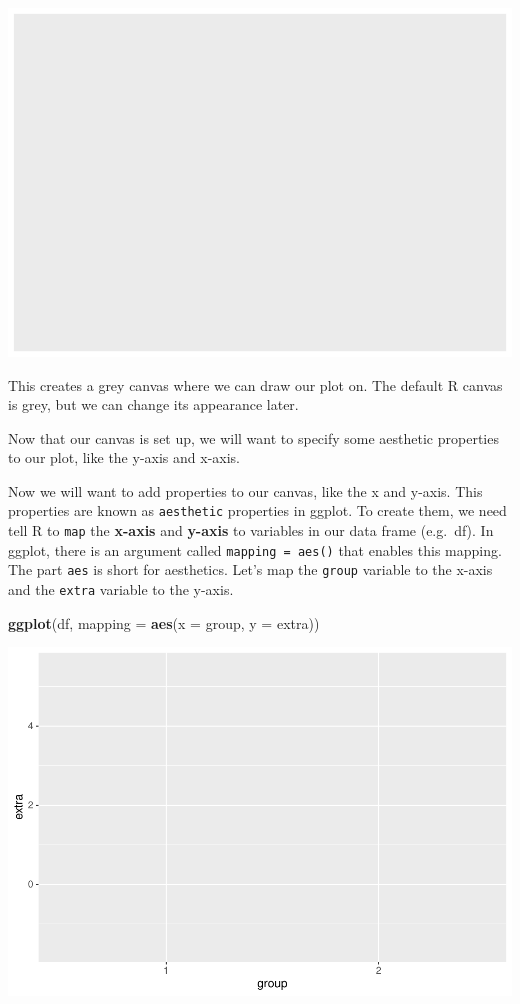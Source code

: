 \documentclass[
]{book}
\newenvironment{Shaded}{\begin{snugshade}}{\end{snugshade}}
\newcommand{\AttributeTok}[1]{\textcolor[rgb]{0.13,0.29,0.53}{#1}}
\newcommand{\FunctionTok}[1]{\textcolor[rgb]{0.13,0.29,0.53}{\textbf{#1}}}
\newcommand{\NormalTok}[1]{#1}
\begin{document}
\includegraphics{rintro_demo_files/figure-latex/unnamed-chunk-277-1.pdf}

This creates a grey canvas where we can draw our plot on. The default R canvas is grey, but we can change its appearance later.

Now that our canvas is set up, we will want to specify some aesthetic properties to our plot, like the y-axis and x-axis.

Now we will want to add properties to our canvas, like the x and y-axis. This properties are known as \texttt{aesthetic} properties in ggplot. To create them, we need tell R to \texttt{map} the \textbf{x-axis} and \textbf{y-axis} to variables in our data frame (e.g.~df). In ggplot, there is an argument called \texttt{mapping\ =\ aes()} that enables this mapping. The part \texttt{aes} is short for aesthetics. Let's map the \texttt{group} variable to the x-axis and the \texttt{extra} variable to the y-axis.

\begin{Shaded}
\begin{Highlighting}[]
\FunctionTok{ggplot}\NormalTok{(df, }\AttributeTok{mapping =} \FunctionTok{aes}\NormalTok{(}\AttributeTok{x =}\NormalTok{ group, }\AttributeTok{y =}\NormalTok{ extra))}
\end{Highlighting}
\end{Shaded}

\includegraphics{rintro_demo_files/figure-latex/unnamed-chunk-278-1.pdf}
\end{document}
